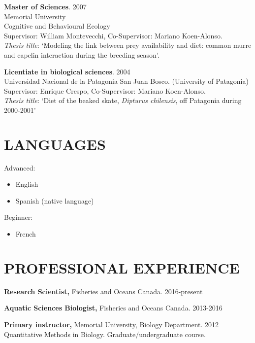\documentclass{res}
\begin{document}
\begin{resume}
\textbf{Master of Sciences}. 2007 \\
Memorial University \\
Cognitive and Behavioural Ecology \\
Supervisor: William Montevecchi, Co-Supervisor: Mariano Koen-Alonso.\\
\textit{Thesis title}: ‘Modeling the link between prey availability and diet: common murre and capelin interaction during the breeding season’.

\textbf{Licentiate in biological sciences}. 2004\\
Universidad Nacional de la Patagonia San Juan Bosco.
(University of Patagonia) \\
Supervisor: Enrique Crespo, Co-Supervisor: Mariano Koen-Alonso.\\
\textit{Thesis title}: ‘Diet of the beaked skate, \textit{Dipturus chilensis}, off Patagonia during 2000-2001’


\section{LANGUAGES}
Advanced:
\begin{itemize}
	\item[] English
	\item[] Spanish (native language)
\end{itemize}
Beginner:
\begin{itemize}
	\item[] French
\end{itemize}


 

 
 

\section{PROFESSIONAL EXPERIENCE}
\vspace{0.1in}
	
\textbf{Research Scientist,} Fisheries and Oceans Canada. 2016-present

\textbf{Aquatic Sciences Biologist,} Fisheries and Oceans Canada. 2013-2016

\textbf{Primary instructor,} Memorial University, Biology Department. 2012 \\ Quantitative Methods in Biology. Graduate/undergraduate course. 


\end{resume}
\end{document}
